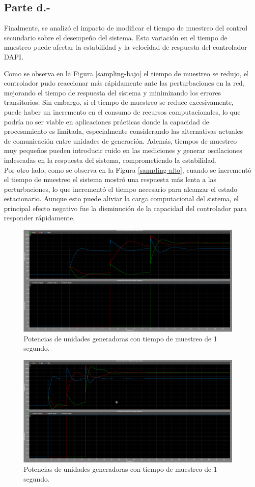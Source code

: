 \subsection{Parte d.-}

Finalmente, se analizó el impacto de modificar el tiempo de muestreo del control secundario sobre el desempeño del sistema. Esta variación en el tiempo de muestreo puede afectar la estabilidad y la velocidad de respuesta del controlador DAPI. 

Como se observa en la Figura \ref{sampling-bajo} el tiempo de muestreo se redujo, el controlador pudo reaccionar más rápidamente ante las perturbaciones en la red, mejorando el tiempo de respuesta del sistema y minimizando los errores transitorios. Sin embargo, si el tiempo de muestreo se reduce excesivamente, puede haber un incremento en el consumo de recursos computacionales, lo que podría no ser viable en aplicaciones prácticas donde la capacidad de procesamiento es limitada, especialmente considerando las alternativas actuales de comunicación entre unidades de generación. Además, tiempos de muestreo muy pequeños pueden introducir ruido en las mediciones y generar oscilaciones indeseadas en la respuesta del sistema, comprometiendo la estabilidad.\\

Por otro lado, como se observa en la Figura \ref{sampling-alto}, cuando se incrementó el tiempo de muestreo el sistema mostró una respuesta más lenta a las perturbaciones, lo que incrementó el tiempo necesario para alcanzar el estado estacionario. Aunque esto puede aliviar la carga computacional del sistema, el principal efecto negativo fue la disminución de la capacidad del controlador para responder rápidamente.


\begin{figure}
    \centering
    \includegraphics[width=0.5\linewidth]{Tarea 2/report/imagenes/p2b/sampling_bajo.png}
    \caption{Potencias de unidades generadoras con tiempo de muestreo de 1 segundo.}
    \label{sampling_bajo}
\end{figure}

\begin{figure}
    \centering
    \includegraphics[width=0.5\linewidth]{Tarea 2/report/imagenes/p2b/sampling_alto.png}
    \caption{Potencias de unidades generadoras con tiempo de muestreo de 1 segundo.}
    \label{sampling_alto}
\end{figure}

